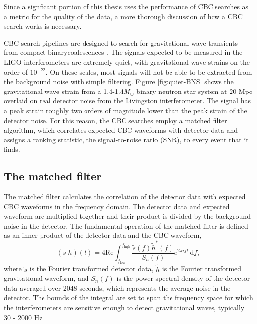 Since a signficant portion of this thesis uses the performance of 
CBC searches as a metric for the quality of the 
data, a more thorough discussion of how a CBC search 
works is necessary.

CBC search pipelines are designed to search for gravitational wave transients 
from compact binarycoalescences \cite{Usman:2015kfa}. 
The signals expected to be measured in the LIGO interferometers are extremely quiet, 
with gravitational wave strains on the order of $10^{-22}$. On these scales, most 
signals will not be able to be extracted from the background noise with simple filtering. 
Figure \ref{fig:quiet-BNS} shows the gravitational wave strain from a 1.4-1.4$M_{\odot}$ 
binary neutron star system at 20 Mpc overlaid on real detector noise from the Livingston 
interferometer. The signal has a peak strain roughly two orders of magnitude lower than 
the peak strain of the detector noise. 
For this reason, the CBC searches employ a matched filter algorithm, which correlates 
expected CBC
waveforms with detector data and assigns a ranking statistic, the signal-to-noise 
ratio (SNR), to every event that it finds. 

\subsection{The matched filter}

The matched filter calculates the correlation of the detector data with expected CBC 
waveforms in the frequency domain. The detector data and expected waveform are 
multiplied together and their product is divided by the background noise in the detector. 
The fundamental operation of the matched filter is defined as an inner product of the 
detector data and the CBC waveform,
\begin{equation}
(s|h)(t) = 4\mathrm{Re}\int_{f_\mathrm{low}}^{f_\mathrm{high}} \frac{\tilde{s}(f)\tilde{h}^*(f)}{S_n (f)}e^{2\pi i f t}\, \mathrm{d}f,
\label{eq:inner-product}
\end{equation}
where $\tilde{s}$ is the Fourier transformed detector data, $\tilde{h}$ is the Fourier
transformed gravitational waveform, and $S_n (f)$ is the power spectral
density of the detector data averaged over 2048 seconds, which represents the average 
noise in the detector. The bounds of the integral are set to span the frequency space 
for which the interferometers are sensitive enough to detect gravitational waves, 
typically 30 - 2000 Hz. 

